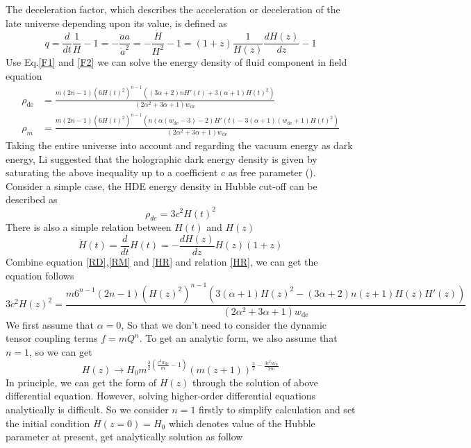 \documentclass[preprint]{aastex631}
\begin{document}
The deceleration factor, which describes the acceleration or deceleration of the late universe depending upon its value, is defined as
\begin{equation}
    q=\frac{d}{dt}\frac{1}{H}-1=-\frac{\ddot{a}a}{\dot{a}^2}=-\frac{\dot{H}}{H^2}-1=(1+z)\frac{1}{H(z)}\frac{dH(z)}{dz}-1   
\end{equation}
Use Eq.\eqref{F1} and \eqref{F2} we can solve the energy density of fluid component in field equation
\begin{align}
    \rho_\text{de}&= \frac{m (2 n-1) \left(6H(t)^2\right)^{n-1} \left((3 \alpha +2) n H'(t)+3 (\alpha +1) H(t)^2\right)}{\left(2 \alpha ^2+3 \alpha +1\right) w_\text{de}} \label{RD}\\
    \rho_m&= \frac{m (2 n-1) \left(6H(t)^2\right)^{n-1} \left(n (\alpha  (w_\text{de}-3)-2) H'(t)-3 (\alpha +1) (w_\text{de}+1) H(t)^2\right)}{\left(2 \alpha ^2+3 \alpha +1\right) w_\text{de}}\label{RM}
\end{align}
Taking the entire universe into account and regarding the vacuum energy as dark energy, Li suggested that the holographic dark energy density is given by saturating the above inequality up to a coefficient $c$ as free parameter (\cite{LI20041}). Consider a simple case, the HDE energy density in Hubble cut-off can be described as 
\begin{equation}
    \rho_{de}=3c^2 H(t)^2 \label{HDE}
\end{equation}
There is also a simple relation between $H(t)$ and $H(z)$
\begin{equation}
    \dot{H}(t)=\frac{d}{dt}H(t)=-\frac{d H(z)}{dz}H(z)(1+z)\label{HR}
\end{equation}
Combine equation \eqref{RD},\eqref{RM} and \eqref{HR} and relation \eqref{HR}, we can get the equation follows
\begin{equation}
    3 c^2 H(z)^2=\frac{m 6^{n-1} (2 n-1) \left(H(z)^2\right)^{n-1} \left(3 (\alpha +1) H(z)^2-(3 \alpha +2) n (z+1) H(z) H'(z)\right)}{\left(2 \alpha ^2+3 \alpha +1\right) {w_\text{de}}}
\end{equation}
We first assume that $\alpha=0$, So that we don't need to consider the dynamic tensor coupling terms $f=mQ^n$. To get an analytic form, we also assume that $n=1$, so we can get
\begin{equation}
    H(z)\to H_0 m^{\frac{3}{2} \left(\frac{c^2 w_\text{de}}{m}-1\right)} (m (z+1))^{\frac{3}{2}-\frac{3 c^2 w_\text{de}}{2 m}}
\end{equation}
In principle, we can get the form of $H(z)$ through the solution of above differential equation. However, solving higher-order differential equations analytically is difficult. So we consider $n=1$ firstly to simplify calculation and set the initial condition $H(z=0)=H_0$ which denotes value of the Hubble parameter at present, get analytically solution as follow
\end{document}
